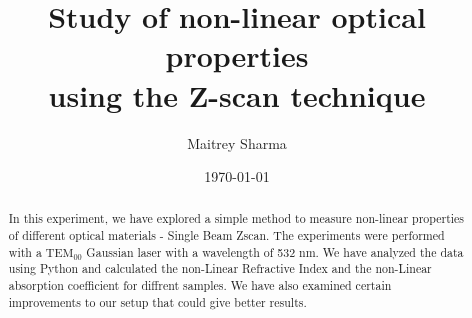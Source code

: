 \documentclass[%
 reprint,
 amsmath,amssymb,
 aps,
]{revtex4-2}
\begin{document}

\title{Study of non-linear optical properties \\using the Z-scan technique}%

\author{Maitrey Sharma}
%




\date{\today}%

\begin{abstract}
In this experiment, we have explored a simple method to measure non-linear properties of different
optical materials - Single Beam Zscan. The experiments were performed with a $ \mathrm{TEM}_{00} $ Gaussian laser
with a wavelength of 532 nm. We have analyzed the data using Python and calculated the non-Linear
Refractive Index  and the non-Linear absorption  coefficient for diffrent samples. We have
also examined certain improvements to our setup that could give better results.
\end{abstract}
\end{document}
